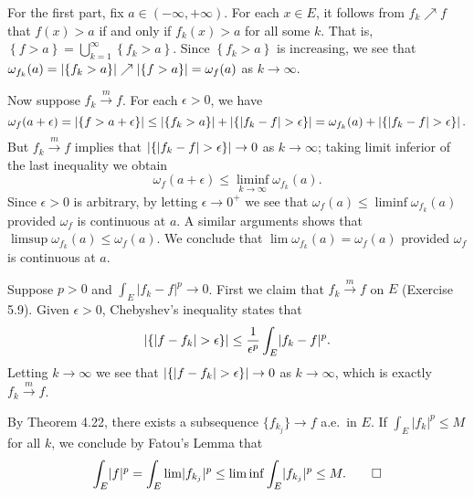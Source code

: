 \begin{exercise}{4.18}
  For the first part, fix $a \in (-\infty, +\infty)$.
  For each $x \in E$,
  it follows from $f_k \nearrow f$ that
  $f(x) > a$ if and only if $f_k(x) > a$ for all some $k$.
  That is, $\left\{ f > a \right\} = \bigcup_{k=1}^{\infty} \left\{ f_k > a \right\}$.
  Since $\left\{ f_k > a \right\}$ is increasing,
  we see that $\omega_{f_k}(a) = \left\vert\left\{ f_k > a \right\}\right\vert \nearrow
  \left\vert\left\{ f > a \right\}\right\vert = \omega_f(a)$ as $k \rightarrow \infty$.

  Now suppose $f_k \xrightarrow{m} f$.
  For each $\epsilon > 0$, we have
  \[
    \omega_f(a + \epsilon) = \left\vert\left\{ f > a + \epsilon \right\}\right\vert \le
    \left\vert\left\{ f_k > a \right\}\right\vert + \left\vert\left\{ \lvert f_k - f \rvert > \epsilon \right\}\right\vert
    = \omega_{f_k}(a) + \left\vert\left\{ \lvert f_k - f \rvert > \epsilon \right\}\right\vert.
  \]
  But $f_k \xrightarrow{m} f$ implies that
  $\left\vert\left\{ \lvert f_k - f \rvert > \epsilon \right\}\right\vert \rightarrow 0$
  as $k \rightarrow \infty$;
  taking limit inferior of the last inequality we obtain
  \[
    \omega_f(a + \epsilon) \le \liminf_{k \rightarrow \infty} \omega_{f_k}(a).
  \]
  Since $\epsilon > 0$ is arbitrary,
  by letting $\epsilon \rightarrow 0^+$ we see that
  $\omega_f(a) \le \liminf \omega_{f_k}(a)$
  provided $\omega_f$ is continuous at $a$.
  A similar arguments shows that $\limsup \omega_{f_k}(a) \le \omega_f(a)$.
  We conclude that $\lim \omega_{f_k}(a) = \omega_f(a)$
  provided $\omega_f$ is continuous at $a$.
\end{exercise}

\begin{exercise}{5.10}
  Suppose $p > 0$ and $\int_E \lvert f_k - f \rvert^p \rightarrow 0$.
  First we claim that $f_k \xrightarrow{m} f$ on $E$ (Exercise 5.9).
  Given $\epsilon > 0$, Chebyshev's inequality states that
  \[
    \left\vert\left\{ \lvert f - f_k \rvert > \epsilon \right\}\right\vert
    \le \frac{1}{\epsilon^p} \int_E \lvert f_k - f \rvert^p.
  \]
  Letting $k \rightarrow \infty$
  we see that $\left\vert\left\{ \lvert f - f_k \rvert > \epsilon \right\}\right\vert \rightarrow 0$
  as $k \rightarrow \infty$,
  which is exactly $f_k \xrightarrow{m} f$.

  By Theorem 4.22, there exists a subsequence $\{f_{k_j}\} \rightarrow f$ a.e.\ in $E$.
  If $\int_E \lvert f_k \rvert^p \le M$ for all $k$,
  we conclude by Fatou's Lemma that
  \[
    \int_E \lvert f \rvert^p = \int_E \lim \lvert f_{k_j} \rvert^p
    \le \liminf \int_E \lvert f_{k_j} \rvert^p \le M.
    \qedhere
  \]
\end{exercise}

